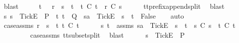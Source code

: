 \begin{isabellebody}
\ blast\isanewline
\ \ \isamarkupfalse%
\ \isamarkupfalse%
\ t{\isacharprime}\ \ {}{\isacharcolon}\ {\isachardoublequoteopen}{\isacharparenleft}r\ {\isacharequal}\ s\ {\isacharat}\ t{\isacharprime}\ {\isasymand}\ t{\isacharprime}\ {\isasymle}\isactrlsub C\ t{\isacharparenright}\ {\isasymor}\ r\ {\isasymle}\isactrlsub C\ s{\isachardoublequoteclose}\isanewline
\ \ \ \ \isamarkupfalse%
\ tt{\isacharunderscore}prefix{\isacharunderscore}append{\isacharunderscore}split\ \isamarkupfalse%
\ blast\isanewline
\ \ \isamarkupfalse%
\ \isamarkupfalse%
\ {\isachardoublequoteopen}{\isasymforall}s{\isachardot}\ s\ {\isacharat}\ {\isacharbrackleft}{\isacharbrackleft}Tick{\isacharbrackright}\isactrlsub E{\isacharbrackright}\ {\isasymin}\ P\ {\isasymlongrightarrow}\ {\isacharparenleft}{\isasymforall}t{\isachardot}\ t\ {\isasymin}\ Q\ {\isasymlongrightarrow}\ sa\ {\isacharat}\ {\isacharbrackleft}{\isacharbrackleft}Tick{\isacharbrackright}\isactrlsub E{\isacharbrackright}\ {\isasymnoteq}\ s\ {\isacharat}\ t{\isacharparenright}\ {\isasymLongrightarrow}\ False{\isachardoublequoteclose}\isanewline
\ \ \isamarkupfalse%
\ auto\isanewline
\ \ \ \ \isamarkupfalse%
\ case{\isacharunderscore}assms{}{\isacharcolon}\ {\isachardoublequoteopen}r\ {\isacharequal}\ s\ {\isacharat}\ t{\isacharprime}{\isachardoublequoteclose}\ {\isachardoublequoteopen}t{\isacharprime}\ {\isasymle}\isactrlsub C\ t{\isachardoublequoteclose}\isanewline
\ \ \ \ \isamarkupfalse%
\ s{\isacharprime}\ t{\isacharprime}{\isacharprime}\ \ {\isasymrho}{\isacharunderscore}assms{\isacharcolon}\ {\isachardoublequoteopen}sa\ {\isacharat}\ {\isacharbrackleft}{\isacharbrackleft}Tick{\isacharbrackright}\isactrlsub E{\isacharbrackright}\ {\isacharequal}\ s{\isacharprime}\ {\isacharat}\ t{\isacharprime}{\isacharprime}\ {\isasymand}\ s{\isacharprime}\ {\isasymsubseteq}\isactrlsub C\ s\ {\isasymand}\ t{\isacharprime}{\isacharprime}\ {\isasymsubseteq}\isactrlsub C\ t{\isacharprime}{\isachardoublequoteclose}\isanewline
\ \ \ \ \ \ \isamarkupfalse%
\ {\isachardoublequoteopen}{}{\isachardoublequoteclose}\ case{\isacharunderscore}assms{}{\isacharparenleft}{}{\isacharparenright}\ tt{\isacharunderscore}subset{\isacharunderscore}split\ \isamarkupfalse%
\ blast\isanewline
\ \ \ \ \isamarkupfalse%
\ {\isachardoublequoteopen}s{\isacharprime}\ {\isacharat}\ {\isacharbrackleft}{\isacharbrackleft}Tick{\isacharbrackright}\isactrlsub E{\isacharbrackright}\ {\isasymin}\ P{\isachardoublequoteclose}\isanewline

\end{isabellebody}

